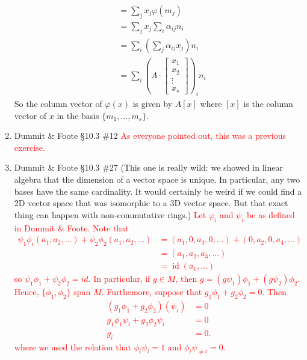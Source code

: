 \documentclass[12pt]{article}
\newcommand{\solution}[1]{\textcolor{red}{#1}}
\begin{document}
\begin{enumerate}
{\begin{align*}
 &= \sum_j x_j \varphi(m_j)\\
&= \sum_j x_j \sum_i \alpha_{ij} n_i\\
&= \sum_i \left( \sum_j \alpha_{ij} x_j \right) n_i\\
&= \sum_i \left( A \cdot \begin{bmatrix} x_1\\ x_2 \\ \vdots \\
    x_s\end{bmatrix} \right)_i n_i
\end{align*}
So the column vector of $\varphi(x)$ is given by $A[x]$ where $[x]$ is
the column vector of $x$ in the basis $\{m_1,\dotsc, m_s\}$. 
}
\item Dummit \& Foote \S 10.3 \#12 \solution{As everyone pointed out,
    this was a previous exercise. }

\item Dummit \& Foote \S 10.3 \#27 (This one is really wild: we showed
  in linear algebra that the dimension of a vector space is unique. In
  particular, any two bases have the same cardinality. It would
  certainly be weird if we could find a 2D vector space that was
  isomorphic to a 3D vector space. But that exact thing can happen
  with non-commutative rings.)
\solution{Let $\varphi_i$ and $\psi_i$ be as defined in Dummit \&
  Foote. Note that
  \begin{align*}
    \psi_1 \phi_i(a_1,a_2,\dotsc) + \psi_2\phi_2(a_1,a_2,\dotsc ) &=
                                                                    (a_1,
                                                                    0,
                                                                    a_3,
                                                                    0,
                                                                    \dotsc
                                                                    )
                                                                    +
                                                                    (0,
                                                                    a_2,
                                                                    0,
                                                                    a_4,
                                                                    \dotsc
                                                                    )\\
 &= (a_1, a_2, a_3, \dotsc) \\
&= \operatorname{id}(a_1,\dotsc)        
  \end{align*}
so $\psi_1 \phi_1 + \psi_2 \phi_2 = id$. In particular, if
$g\in M$, then $g=(g\psi_1)\phi_1 + (g\psi_2)\phi_2$. Hence,
$\{\phi_1, \phi_2\}$ span $M$. Furthemore, suppose that $g_1 \phi_1 +
g_2 \phi_2=0$. Then 
\begin{align*}
(g_1 \phi_1+g_2\phi_2)(\psi_i) &=0\\
 g_1 \phi_1 \psi_i + g_2 \phi_2
                                 \psi_i &= 0\\
 g_i & = 0.
\end{align*}
where we used the relation that $\phi_i \psi_i=1$ and
$\phi_i\psi_{\neq i} = 0$. }
\end{enumerate}
\end{document}
